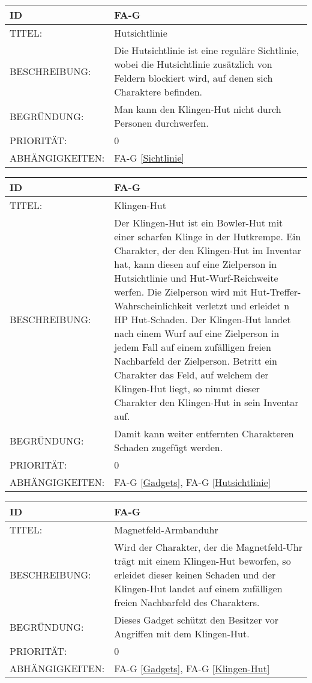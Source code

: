 \begin{tabularx}{16cm}{l|X}
	{table}\label{Hutsichtlinie}
	\textbf{ID} & \textbf{FA-G \arabic{table}} \\
	\hline
	TITEL: & Hutsichtlinie \\
	\hline
	BESCHREIBUNG: & Die Hutsichtlinie ist eine reguläre Sichtlinie, wobei die Hutsichtlinie zusätzlich von Feldern blockiert wird, auf denen sich Charaktere befinden. \\
	\hline
	BEGRÜNDUNG: &  Man kann den Klingen-Hut nicht durch Personen durchwerfen. \\
	\hline
	PRIORITÄT: & 0\\
	\hline
	ABHÄNGIGKEITEN: & FA-G \ref{Sichtlinie} \\
\end{tabularx}

\begin{tabularx}{16cm}{l|X}
	{table}\label{Klingen-Hut}
	\textbf{ID} & \textbf{FA-G \arabic{table}} \\
	\hline
	TITEL: & Klingen-Hut \\
	\hline
	BESCHREIBUNG: & Der Klingen-Hut ist ein Bowler-Hut mit einer scharfen Klinge in der Hutkrempe. Ein Charakter, der den Klingen-Hut im Inventar hat, kann diesen auf eine Zielperson in Hutsichtlinie und Hut-Wurf-Reichweite werfen. Die Zielperson wird mit Hut-Treffer-Wahrscheinlichkeit verletzt und erleidet n HP Hut-Schaden. Der Klingen-Hut landet nach einem Wurf auf eine Zielperson in jedem Fall auf einem zufälligen freien Nachbarfeld der Zielperson. Betritt ein Charakter das Feld, auf welchem der Klingen-Hut liegt, so nimmt dieser Charakter den Klingen-Hut in sein Inventar auf. \\
	\hline
	BEGRÜNDUNG: &  Damit kann weiter entfernten Charakteren Schaden zugefügt werden. \\
	\hline
	PRIORITÄT: & 0\\
	\hline
	ABHÄNGIGKEITEN: & FA-G \ref{Gadgets}, FA-G \ref{Hutsichtlinie} \\
\end{tabularx}

\begin{tabularx}{16cm}{l|X}
	{table}\label{Magnetfeld-Armbanduhr}
	\textbf{ID} & \textbf{FA-G \arabic{table}} \\
	\hline
	TITEL: & Magnetfeld-Armbanduhr \\
	\hline
	BESCHREIBUNG: & Wird der Charakter, der die Magnetfeld-Uhr trägt mit einem Klingen-Hut beworfen, so erleidet dieser keinen Schaden und der Klingen-Hut landet auf einem zufälligen freien Nachbarfeld des Charakters. \\
	\hline
	BEGRÜNDUNG: &  Dieses Gadget schützt den Besitzer vor Angriffen mit dem Klingen-Hut. \\
	\hline
	PRIORITÄT: & 0\\
	\hline
	ABHÄNGIGKEITEN: & FA-G \ref{Gadgets}, FA-G \ref{Klingen-Hut} \\
\end{tabularx}


